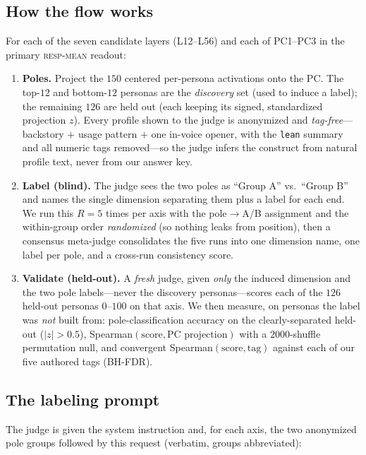 \documentclass{article}
\newcommand{\respmean}{\textsc{resp-mean}}
\begin{document}
\subsection*{How the flow works}
For each of the seven candidate layers (L12--L56) and each of PC1--PC3 in the
primary \respmean{} readout:
\begin{enumerate}\itemsep2pt
\item \textbf{Poles.} Project the $150$ centered per-persona activations onto the PC.
  The top-$12$ and bottom-$12$ personas are the \emph{discovery} set (used to induce
  a label); the remaining $126$ are held out (each keeping its signed, standardized
  projection $z$). Every profile shown to the judge is anonymized and
  \emph{tag-free}---backstory $+$ usage pattern $+$ one in-voice opener, with the
  \texttt{lean} summary and all numeric tags removed---so the judge infers the
  construct from natural profile text, never from our answer key.
\item \textbf{Label (blind).} The judge sees the two poles as ``Group A'' vs.\
  ``Group B'' and names the single dimension separating them plus a label for each
  end. We run this $R{=}5$ times per axis with the pole$\to$A/B assignment and the
  within-group order \emph{randomized} (so nothing leaks from position), then a
  consensus meta-judge consolidates the five runs into one dimension name, one label
  per pole, and a cross-run consistency score.
\item \textbf{Validate (held-out).} A \emph{fresh} judge, given \emph{only} the
  induced dimension and the two pole labels---never the discovery personas---scores
  each of the $126$ held-out personas $0$--$100$ on that axis. We then measure, on
  personas the label was \emph{not} built from: pole-classification accuracy on the
  clearly-separated held-out ($|z|{>}0.5$), Spearman$(\text{score},\text{PC
  projection})$ with a $2000$-shuffle permutation null, and convergent
  Spearman$(\text{score},\text{tag})$ against each of our five authored tags
  (BH-FDR).
\end{enumerate}

\subsection*{The labeling prompt}
The judge is given the system instruction and, for each axis, the two anonymized
pole groups followed by this request (verbatim, groups abbreviated):
\end{document}
